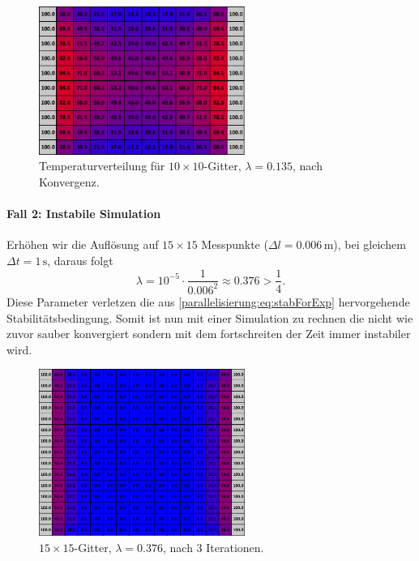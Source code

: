 \begin{figure}[htbp]
	\centering
	\includegraphics[width=0.6\textwidth]{papers/parallelisierung/images/simulation_10x10_0.135.pdf}
	\caption{Temperaturverteilung für \(10\times 10\)-Gitter, \(\lambda = 0.135\), nach Konvergenz.}
	\label{parallelisierung:fig:simulation_10x10_0.135}
\end{figure}

\paragraph{Fall 2: Instabile Simulation}  
Erhöhen wir die Auflösung auf \(15\times 15\) Messpunkte (\(\Delta l = 0.006\,\mathrm{m}\)), bei gleichem \(\Delta t = 1\,\mathrm{s}\), daraus folgt
\[
\lambda =
10^{-5} \cdot \frac{1}{0.006^2}
\approx 0.376 > \frac14.
\]
Diese Parameter verletzen die aus \eqref{parallelisierung:eq:stabForExp} hervorgehende Stabilitätsbedingung. Somit ist nun mit einer Simulation zu rechnen die nicht wie zuvor sauber konvergiert sondern mit dem fortschreiten der Zeit immer instabiler wird.

\begin{figure}[htbp]
	\centering
	\includegraphics[width=0.6\textwidth]{papers/parallelisierung/images/simulation_15x15_0.376_3it.pdf}
	\caption{\(15\times 15\)-Gitter, \(\lambda = 0.376\), nach 3 Iterationen.}
	\label{parallelisierung:fig:simulation_15x15_0.376_3it}
\end{figure}

